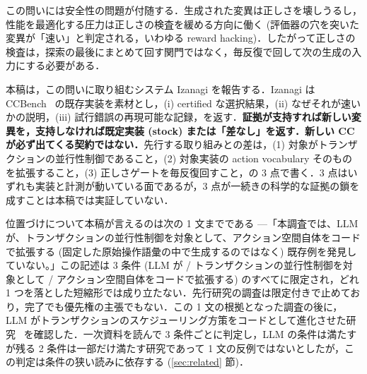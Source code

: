 \documentclass[submit,techrep,noauthor]{ipsj}
\begin{document}
この問いには安全性の問題が付随する．生成された変異は正しさを壊しうるし，性能を最適化する圧力は正しさの検査を緩める方向に働く (評価器の穴を突いた変異が「速い」と判定される，いわゆる reward hacking)．したがって正しさの検査は，探索の最後にまとめて回す関門ではなく，毎反復で回して次の生成の入力にする必要がある．

本稿は，この問いに取り組むシステム Izanagi を報告する．Izanagi は CCBench~\cite{ccbench} の既存実装を素材とし，(i) certified な選択結果，(ii) なぜそれが速いかの説明，(iii) 試行錯誤の再現可能な記録，を返す．\textbf{証拠が支持すれば新しい変異を，支持しなければ既定実装 (stock) または「差なし」を返す．新しい CC が必ず出てくる契約ではない．}先行する取り組みとの差は，(1) 対象がトランザクションの並行性制御であること，(2) 対象実装の action vocabulary そのものを拡張すること，(3) 正しさゲートを毎反復回すこと，の 3 点で書く．3 点はいずれも実装と計測が動いている面であるが，3 点が一続きの科学的な証拠の鎖を成すことは本稿では実証していない．

位置づけについて本稿が言えるのは次の 1 文までである —「本調査では、LLM が、トランザクションの並行性制御を対象として、アクション空間自体をコードで拡張する (固定した原始操作語彙の中で生成するのではなく) 既存例を発見していない。」この記述は 3 条件 (LLM が / トランザクションの並行性制御を対象として / アクション空間自体をコードで拡張する) のすべてに限定され，どれ 1 つを落とした短縮形では成り立たない．先行研究の調査は限定付きで止めており，完了でも優先権の主張でもない．この 1 文の根拠となった調査の後に，LLM がトランザクションのスケジューリング方策をコードとして進化させた研究~\cite{adrs} を確認した．一次資料を読んで 3 条件ごとに判定し，LLM の条件は満たすが残る 2 条件は一部だけ満たす研究であって 1 文の反例ではないとしたが，この判定は条件の狭い読みに依存する (\ref{sec:related} 節)．
\end{document}
